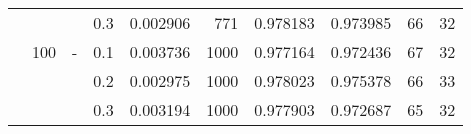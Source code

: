 \begin{table}[h!]
\begin{tabular}{llllrrrrrr}
          &     &   & 0.3 &  0.002906 &     771 &     0.978183 &     0.973985 &          66 &        32 \\
          & 100 & - & 0.1 &  0.003736 &    1000 &     0.977164 &     0.972436 &          67 &        32 \\
          &     &   & 0.2 &  0.002975 &    1000 &     0.978023 &     0.975378 &          66 &        33 \\
          &     &   & 0.3 &  0.003194 &    1000 &     0.977903 &     0.972687 &          65 &        32 \\
\bottomrule
\end{tabular}
\end{table}
